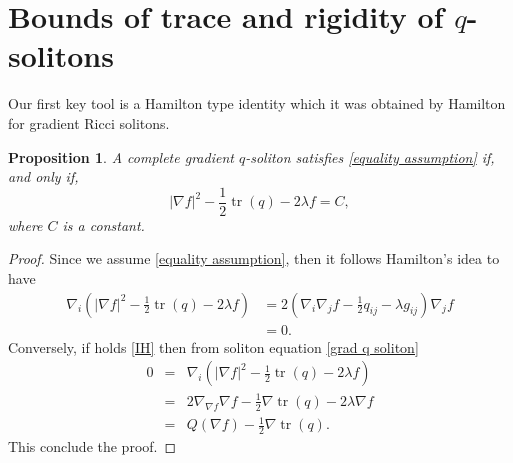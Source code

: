 \documentclass{amsart}
\theoremstyle{plain}
\newtheorem{proposition}[theorem]{\bf Proposition}
\numberwithin{equation}{section}
\begin{document}
    

\noindent

\section{Bounds of trace and rigidity of $q$-solitons}

Our first key tool is a Hamilton type identity which it was obtained by Hamilton \cite{Hamilton} for gradient Ricci solitons.

\begin{proposition}\label{Hamilton identity}  A complete gradient $q$-soliton satisfies \eqref{equality assumption} if, and only if,  \begin{equation}\label{IH}
|\nabla f|^2 - \frac{1}{2}\operatorname{tr}(q)-2\lambda f=C,
\end{equation}
where $C$ is a constant.
    
\end{proposition}
\begin{proof}
Since we assume \eqref{equality assumption}, then it follows Hamilton's idea to have 
\begin{align*}
 \nabla_{i}\left( |\nabla f|^2 - \frac{1}{2}\operatorname{tr}(q)-2\lambda f  \right)&=2(\nabla_{i}\nabla_{j}f-\frac{1}{2} q_{ij}-\lambda g_{ij})\nabla_{j}f\\
&=0.
\end{align*}
Conversely, if holds \eqref{IH} then from soliton equation \eqref{grad q soliton}
\begin{eqnarray*}
    0 &=& \nabla_{i}\left( |\nabla f|^2 - \frac{1}{2}\operatorname{tr}(q)-2\lambda f  \right)\\
    &=& 2\nabla_{\nabla f}\nabla f-\frac{1}{2}\nabla\operatorname{tr}(q)-2\lambda \nabla f\\
    &=& Q(\nabla f)-\frac{1}{2}\nabla\operatorname{tr}(q).
\end{eqnarray*}
This conclude the proof.
\end{proof}
\end{document}
